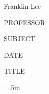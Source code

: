 \documentclass[12pt]{article}
\newcommand\lm{.5in}
\begin{document}
Franklin Lee

PROFESSOR                       %

SUBJECT                         %

DATE                            %

{\centering TITLE\par}          %

\parindent=\lm
\frenchspacing

\end{document}
